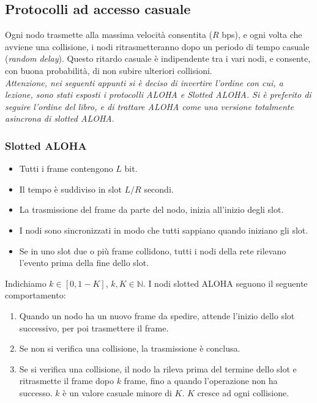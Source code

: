 \newpage

\subsection{Protocolli ad accesso casuale}
Ogni nodo trasmette alla massima velocità consentita ($R$ bps), e ogni volta che avviene una collisione, i nodi ritrasmetteranno dopo un periodo di tempo casuale (\textit{random delay}). Questo ritardo casuale è indipendente tra i vari nodi, e consente, con buona probabilità, di non subire ulteriori collisioni.\\
\textit{Attenzione, nei seguenti appunti si è deciso di invertire l'ordine con cui, a lezione, sono stati esposti i protocolli ALOHA e Slotted ALOHA. Si è preferito di seguire l'ordine del libro, e di trattare ALOHA come una versione totalmente asincrona di slotted ALOHA}.

\subsubsection{Slotted ALOHA}

\begin{itemize}
	\item Tutti i frame contengono $L$ bit.
	\item Il tempo è suddiviso in slot $L/R$ secondi.
	\item La trasmissione del frame da parte del nodo, inizia all'inizio degli slot.
	\item I nodi sono sincronizzati in modo che tutti sappiano quando iniziano gli slot.
	\item Se in uno slot due o più frame collidono, tutti i nodi della rete rilevano l'evento prima della fine dello slot.
\end{itemize}

Indichiamo $k \in [0,1-K]$, $k, K\in \mathbb{N}$. I nodi slotted ALOHA seguono il seguente comportamento:
\begin{enumerate}
	\item Quando un nodo ha un nuovo frame da spedire, attende l'inizio dello slot successivo, per poi trasmettere il frame.
	
	\item Se non si verifica una collisione, la trasmissione è conclusa.
	
	\item Se si verifica una collisione, il nodo la rileva prima del termine dello slot e ritrasmette il frame dopo $k$ frame, fino a quando l'operazione non ha successo. $k$ è un valore casuale minore di $K$. $K$ cresce ad ogni collisione. 
\end{enumerate}

